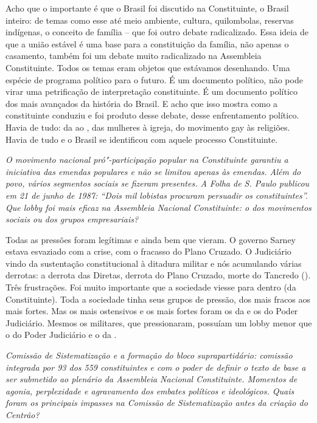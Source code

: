 Acho que o importante é que o Brasil foi discutido na Constituinte, o
Brasil inteiro: de temas como esse até meio ambiente, cultura,
quilombolas, reservas indígenas, o conceito de família -- que foi outro
debate radicalizado. Essa ideia de que a união estável é uma base para a
constituição da família, não apenas o casamento, também foi um debate
muito radicalizado na Assembleia Constituinte. Todos os temas eram
objetos que estávamos desenhando. Uma espécie de programa político para
o futuro. É um documento político, não pode virar uma petrificação de
interpretação constituinte. É um documento político dos mais avançados
da história do Brasil. E acho que isso mostra como a constituinte
conduziu e foi produto desse debate, desse enfrentamento político. Havia
de tudo: da  ao , das mulheres à igreja, do movimento gay às
religiões. Havia de tudo e o Brasil se identificou com aquele processo
Constituinte.

\medskip

\noindent\emph{O movimento nacional pró"-participação popular na Constituinte
garantiu a iniciativa das emendas populares e não se limitou apenas às
emendas. Além do povo, vários segmentos sociais se fizeram presentes. A
\emph{Folha de S. Paulo} publicou em 21 de junho de 1987: ``Dois mil lobistas
procuram persuadir os constituintes''. Que lobby foi mais eficaz na
Assembleia Nacional Constituinte: o dos movimentos sociais ou dos grupos
empresariais?}

Todas as pressões foram legítimas e ainda bem que
vieram. O governo Sarney estava esvaziado com a crise, com o fracasso do
Plano Cruzado. O Judiciário vindo da sustentação constitucional à
ditadura militar e nós acumulando várias derrotas: a derrota das
Diretas, derrota do Plano Cruzado, morte do Tancredo (). Três
frustrações. Foi muito importante que a sociedade viesse para dentro (da
Constituinte). Toda a sociedade tinha seus grupos de pressão, dos mais
fracos aos mais fortes. Mas os mais ostensivos e os mais fortes foram os
da  e os do Poder Judiciário. Mesmos os militares, que pressionaram,
possuíam um lobby menor que o do Poder Judiciário e o da .

\medskip

\noindent\emph{Comissão de Sistematização e a formação do bloco suprapartidário: comissão integrada por 93 dos 559 constituintes e com o poder de definir o texto de base a ser submetido ao plenário da
Assembleia Nacional Constituinte. Momentos de agonia, perplexidade e
agravamento dos embates políticos e ideológicos. Quais foram os
principais impasses na Comissão de Sistematização antes da criação do
Centrão?}

